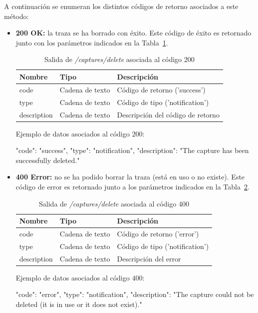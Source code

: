 A continuación se enumeran los distintos códigos de retorno asociados a este método:
\begin{itemize}

\item{\textbf{200 OK:} la \gls{traza} se ha borrado con éxito.
Este código de éxito es retornado junto con los parámetros indicados en la Tabla~\ref{extra:api:capturesdelete:ok}.
\begin{table}[H]
\centering
\begin{tabular}{|l|l|l|}
\hline
\rowcolor[HTML]{F5F5F5}
\textbf{Nombre}  & \textbf{Tipo}   & \textbf{Descripción}              \\ \hline
code             & Cadena de texto & Código de retorno ('success')     \\ \hline
type             & Cadena de texto & Código de tipo ('notification')   \\ \hline
description      & Cadena de texto & Descripción del código de retorno \\ \hline
\end{tabular}
\caption{Salida de \textit{/captures/delete} asociada al código 200}
\label{extra:api:capturesdelete:ok}
\end{table}
\begin{minipage}{\textwidth}
Ejemplo de datos asociados al código 200:

\begin{code}[language=json]
{
  "code": "success",
  "type": "notification",
  "description": "The capture has been successfully deleted."
}
\end{code}
\end{minipage}
}

\item{\textbf{400 Error:} no se ha podido borrar la \gls{traza} (está en uso o no existe).
Este código de error es retornado junto a los parámetros indicados en la Tabla~\ref{extra:api:capturesdelete:error}.
\begin{table}[H]
\centering
\begin{tabular}{|l|l|l|}
\hline
\rowcolor[HTML]{F5F5F5}
\textbf{Nombre}  & \textbf{Tipo}   & \textbf{Descripción}            \\ \hline
code             & Cadena de texto & Código de retorno ('error')     \\ \hline
type             & Cadena de texto & Código de tipo ('notification') \\ \hline
description      & Cadena de texto & Descripción del error           \\ \hline
\end{tabular}
\caption{Salida de \textit{/captures/delete} asociada al código 400}
\label{extra:api:capturesdelete:error}
\end{table}
\begin{minipage}{\textwidth}
Ejemplo de datos asociados al código 400:

\begin{code}[language=json]
{
  "code": "error",
  "type": "notification",
  "description": "The capture could not be deleted (it is in use or it does not exist)."
}
\end{code}
\end{minipage}
}
\end{itemize}
